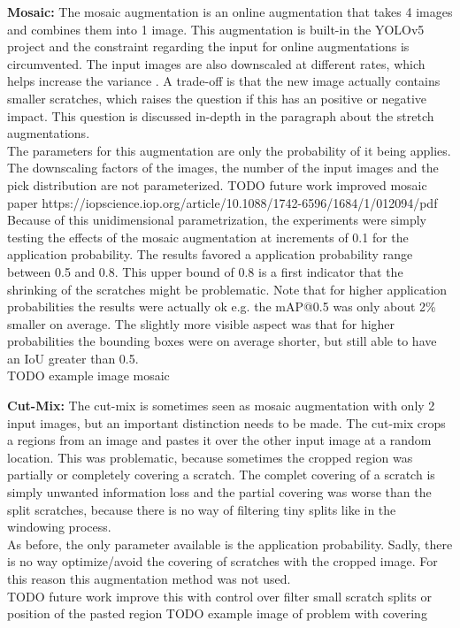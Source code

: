 \textbf{Mosaic:} The mosaic augmentation is an online augmentation that takes 4 images and combines them into 1 image. This augmentation is built-in the YOLOv5 project and the constraint regarding the input for online augmentations is circumvented.
The input images are also downscaled at different rates, which helps increase the variance . A trade-off is that the new image actually contains smaller scratches, which raises the question if this has an positive or negative impact. This question is discussed in-depth in the paragraph about the stretch augmentations. \\
The parameters for this augmentation are only the probability of it being applies. The downscaling factors of the images, the number of the input images and the pick distribution are not parameterized. TODO future work improved mosaic paper https://iopscience.iop.org/article/10.1088/1742-6596/1684/1/012094/pdf
Because of this unidimensional parametrization, the experiments were simply testing the effects of the mosaic augmentation at increments of 0.1 for the application probability. The results favored a application probability range between 0.5 and 0.8. This upper bound of 0.8 is a first indicator that the shrinking of the scratches might be problematic. Note that for higher application probabilities the results were actually ok e.g. the mAP@0.5 was only about 2\% smaller on average. The slightly more visible aspect was that for higher probabilities the bounding boxes were on average shorter, but still able to have an  IoU greater than 0.5. \\

TODO example image mosaic

\textbf{Cut-Mix:}
The cut-mix is sometimes seen as mosaic augmentation with only 2 input images, but an important distinction needs to be made. The cut-mix crops a regions from an image and pastes it over the other input image at a random location. This was problematic, because sometimes the cropped region was partially or completely covering a scratch. The complet covering of a scratch is simply unwanted information loss and the partial covering was worse than the split scratches, because there is no way of filtering tiny splits like in the windowing process. \\
As before, the only parameter available is the application probability. Sadly, there is no way optimize/avoid the covering of scratches with the cropped image. For this reason this augmentation method was not used. \\
TODO future work improve this with control over filter small scratch splits or position of the pasted region
TODO example image of problem with covering


